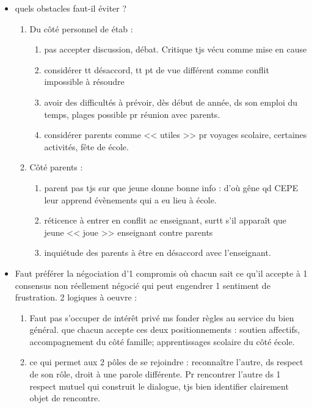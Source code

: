\documentclass[12pt]{report}
\begin{document}
\begin{itemize}
\item quels obstacles faut-il éviter ?
\begin{enumerate}
\item Du côté personnel de étab : 
\begin{enumerate}
\item pas accepter discussion, débat. Critique tjs vécu comme mise en cause \\
\item considérer tt désaccord, tt pt de vue différent comme conflit impossible à résoudre \\
\item avoir des difficultés à prévoir, dès début de année, ds son emploi du temps, plages possible pr réunion avec parents.\\
\item considérer parents comme << utiles >> pr voyages scolaire, certaines activités, fête de école.
\end{enumerate}

\item Côté parents : 
\begin{enumerate}
\item parent pas tjs sur que jeune donne bonne info : d'où gêne qd CEPE leur apprend évènements qui a eu lieu à école.\\
\item réticence à entrer en conflit ac enseignant, surtt s'il apparaît que jeune << joue >> enseignant contre parents \\
\item inquiétude des parents à être en désaccord avec l'enseignant.\\
\end{enumerate}
\end{enumerate}

\item Faut préférer la négociation d'1 compromis où chacun sait ce qu'il accepte à 1 consensus non réellement négocié qui peut engendrer 1 sentiment de frustration. 2 logiques à oeuvre : 
\begin{enumerate}
\item Faut pas s'occuper de intérêt privé ms fonder règles au service du bien général. que chacun accepte ces deux positionnements : soutien affectifs, accompagnement du côté famille; apprentissages scolaire du côté école.\\
\item ce qui permet aux 2 pôles de se rejoindre : reconnaître l'autre, ds respect de son rôle, droit à une parole différente. Pr rencontrer l'autre ds  1 respect mutuel qui construit le dialogue, tjs bien identifier clairement objet de rencontre. \\
\end{enumerate}


\end{itemize}
\end{document}
